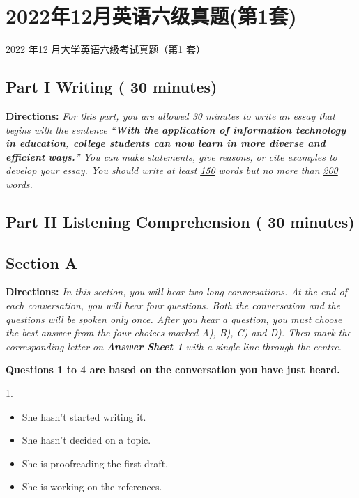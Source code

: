 \documentclass[UTF8,11pt]{ctexart}
\begin{document}
\section*{2022年12月英语六级真题(第1套)}
2022 年12 月大学英语六级考试真题（第1 套）


\subsection*{\textbf{Part I Writing} \textbf{( 30 minutes)}}


\textbf{Directions:}\textit{ For this part, you are allowed 30 minutes to write an essay that begins with the sentence “}\textbf{\textit{With the}} \textbf{\textit{application of information technology in education, college students can now learn in more diverse and efficient}} \textbf{\textit{ways.}}\textit{” You can make statements, give reasons, or cite examples to develop your essay. You should write at least }\textit{\uline{150}} \textit{words but no more than }\textit{\uline{200 }}\textit{words.}


\subsection*{\textbf{Part II} \textbf{Listening Comprehension} \textbf{( 30 minutes)}}


\subsection*{\textbf{Section A}}


\textbf{Directions:} \textit{In this section, you will hear two long conversations. At the end of each conversation, you will hear four} \textit{questions. Both the conversation and the questions will be spoken only once. After you hear a question, you must} \textit{choose the best answer from the four choices marked A), B), C) and D). Then mark the corresponding letter on} \textbf{\textit{Answer Sheet 1}}\textit{ with a single line through the centre.}


\textbf{Questions 1 to 4 are based on the conversation you have just heard.}


1.


\begin{itemize}[leftmargin=2em,itemsep=.2em,topsep=.4em]\item[A.] She hasn’t started writing it.
\item[B.] She hasn’t decided on a topic.
\item[C.] She is proofreading the first draft.
\item[D.] She is working on the references.
\end{itemize}
\end{document}
